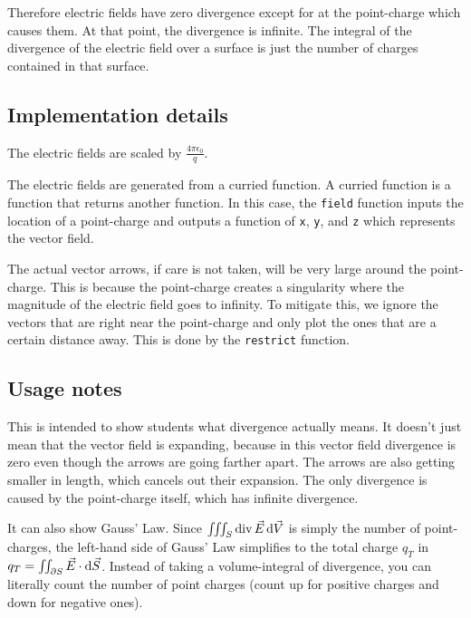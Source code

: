 Therefore electric fields have zero divergence except for at the point-charge which causes them. At that point, the divergence is infinite. The integral of the divergence of the electric field over a surface is just the number of charges contained in that surface.

\subsection*{Implementation details}

The electric fields are scaled by \(\frac{4 \pi \epsilon_0}{q}\).

The electric fields are generated from a curried function. A curried function is a function that returns another function. In this case, the \verb+field+ function inputs the location of a point-charge and outputs a function of \verb+x+, \verb+y+, and \verb+z+ which represents the vector field.

The actual vector arrows, if care is not taken, will be very large around the point-charge. This is because the point-charge creates a singularity where the magnitude of the electric field goes to infinity. To mitigate this, we ignore the vectors that are right near the point-charge and only plot the ones that are a certain distance away. This is done by the \verb+restrict+ function.

\subsection*{Usage notes}

This is intended to show students what divergence actually means. It doesn't just mean that the vector field is expanding, because in this vector field divergence is zero even though the arrows are going farther apart. The arrows are also getting smaller in length, which cancels out their expansion. The only divergence is caused by the point-charge itself, which has infinite divergence.

It can also show Gauss' Law. Since \(\iiint_S \divf \vec E \dif \vec V\) is simply the number of point-charges, the left-hand side of Gauss' Law simplifies to the total charge \(q_T\) in \(q_T = \iint_{\partial S} \vec E \cdot \dif \vec S\). Instead of taking a volume-integral of divergence, you can literally count the number of point charges (count up for positive charges and down for negative ones).


